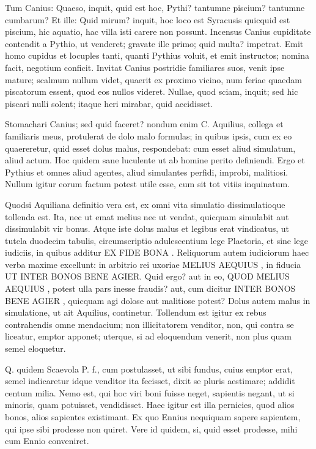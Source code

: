  Tum Canius: Quaeso, inquit, quid est hoc, Pythi? tantumne piscium? tantumne cumbarum? Et ille: Quid mirum? inquit, hoc loco est Syracusis quicquid est piscium, hic aquatio, hac villa isti carere non possunt. Incensus Canius cupiditate contendit a Pythio, ut venderet; gravate ille primo; quid multa? impetrat. Emit homo cupidus et locuples tanti, quanti Pythius voluit, et emit instructos; nomina facit, negotium conficit. Invitat Canius postridie familiares suos, venit ipse mature; scalmum nullum videt, quaerit ex proximo vicino, num feriae quaedam piscatorum essent, quod eos nullos videret. Nullae, quod sciam, inquit; sed hic piscari nulli solent; itaque heri mirabar, quid accidisset.

 Stomachari Canius; sed quid faceret? nondum enim C. Aquilius, collega et familiaris meus, protulerat de dolo malo formulas; in quibus ipsis, cum ex eo quaereretur, quid esset dolus malus, respondebat: cum esset aliud simulatum, aliud actum. Hoc quidem sane luculente ut ab homine perito definiendi. Ergo et Pythius et omnes aliud agentes, aliud simulantes perfidi, improbi, malitiosi. Nullum igitur eorum factum potest utile esse, cum sit tot vitiis inquinatum.

 Quodsi Aquiliana definitio vera est, ex omni vita simulatio dissimulatioque tollenda est. Ita, nec ut emat melius nec ut vendat, quicquam simulabit aut dissimulabit vir bonus. Atque iste dolus malus et legibus erat vindicatus, ut tutela duodecim tabulis, circumscriptio adulescentium lege Plaetoria, et sine lege iudiciis, in quibus additur EX FIDE BONA . Reliquorum autem iudiciorum haec verba maxime excellunt: in arbitrio rei uxoriae MELIUS AEQUIUS , in fiducia UT INTER BONOS BENE AGIER. Quid ergo? aut in eo, QUOD MELIUS AEQUIUS , potest ulla pars inesse fraudis? aut, cum dicitur INTER BONOS BENE AGIER , quicquam agi dolose aut malitiose potest? Dolus autem malus in simulatione, ut ait Aquilius, continetur. Tollendum est igitur ex rebus contrahendis omne mendacium; non illicitatorem venditor, non, qui contra se liceatur, emptor apponet; uterque, si ad eloquendum venerit, non plus quam semel eloquetur.

 Q. quidem Scaevola P. f., cum postulasset, ut sibi fundus, cuius emptor erat, semel indicaretur idque venditor ita fecisset, dixit se pluris aestimare; addidit centum milia. Nemo est, qui hoc viri boni fuisse neget, sapientis negant, ut si minoris, quam potuisset, vendidisset. Haec igitur est illa pernicies, quod alios bonos, alios sapientes existimant. Ex quo Ennius nequiquam sapere sapientem, qui ipse sibi prodesse non quiret. Vere id quidem, si, quid esset prodesse, mihi cum Ennio conveniret.

